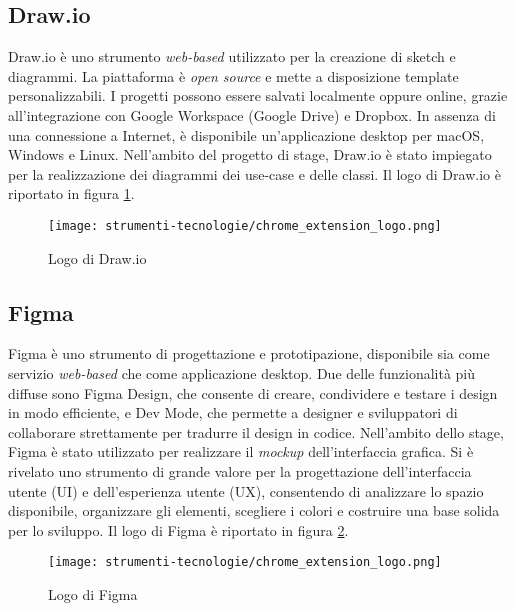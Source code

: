 \subsection*{Draw.io}

\par Draw.io è uno strumento \textit{web-based} utilizzato per la creazione di sketch e diagrammi. La piattaforma è \textit{open source} e mette a disposizione template personalizzabili. I progetti possono essere salvati localmente oppure online, grazie all’integrazione con Google Workspace (Google Drive) e Dropbox. In assenza di una connessione a Internet, è disponibile un'applicazione desktop per macOS, Windows e Linux. Nell’ambito del progetto di stage, Draw.io è stato impiegato per la realizzazione dei diagrammi dei \gls{use-case} e delle classi. Il logo di Draw.io è riportato in figura \ref{fig:logo_draw_io}.

\begin{figure}[H]
  \centering 
  \texttt{[image: strumenti-tecnologie/chrome\_extension\_logo.png]} 
  \caption{Logo di Draw.io}
  \label{fig:logo_draw_io}
\end{figure}

\subsection*{Figma}

\par Figma è uno strumento di progettazione e prototipazione, disponibile sia come servizio \textit{web-based} che come applicazione desktop. Due delle funzionalità più diffuse sono Figma Design, che consente di creare, condividere e testare i design in modo efficiente, e Dev Mode, che permette a designer e sviluppatori di collaborare strettamente per tradurre il design in codice. Nell’ambito dello stage, Figma è stato utilizzato per realizzare il \textit{mockup} dell’interfaccia grafica. Si è rivelato uno strumento di grande valore per la progettazione dell'interfaccia utente (UI) e dell’esperienza utente (UX), consentendo di analizzare lo spazio disponibile, organizzare gli elementi, scegliere i colori e costruire una base solida per lo sviluppo. Il logo di Figma è riportato in figura \ref{fig:logo_figma}.

\begin{figure}[H]
  \centering 
  \texttt{[image: strumenti-tecnologie/chrome\_extension\_logo.png]} 
  \caption{Logo di Figma}
  \label{fig:logo_figma}
\end{figure}

